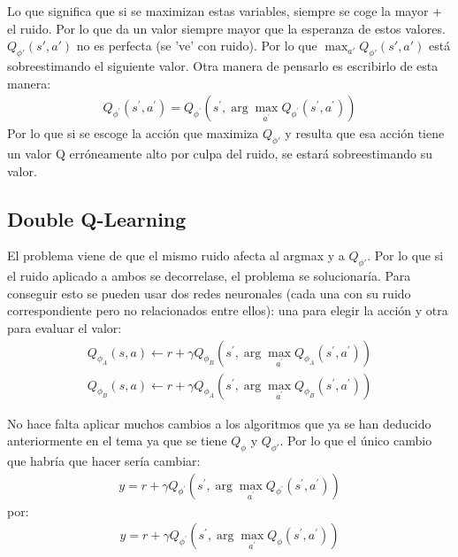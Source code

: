 Lo que significa que si se maximizan estas variables, siempre se coge la mayor + el ruido.
Por lo que da un valor siempre mayor que la esperanza de estos valores. $Q_{ \phi' }(s',a')$ no
es perfecta (se 've' con ruido). Por lo que  $\max_{a'}Q_{\phi'}(s',a')$ está sobreestimando
el siguiente valor. Otra manera de pensarlo es escribirlo de esta manera:
\begin{align}
    \label{eq:argmax}
Q _ { \phi ^ { \prime } } ( s ^ { \prime } , a ^ { \prime } ) = Q _ { \phi ^ { \prime } } ( s ^ { \prime } , \operatorname { arg } \operatorname { max } _ { a ^ { \prime } } Q _ { \phi ^ { \prime } } ( s ^ { \prime } , a ^ { \prime } ) )
\end{align}
Por lo que si se escoge la acción que maximiza $Q_{\phi'}$ y resulta que esa acción tiene un
valor Q erróneamente alto por culpa del ruido, se estará sobreestimando su valor.

\subsection{Double Q-Learning}%
\label{sub:double_q_learning}

El problema viene de que el mismo ruido afecta al argmax y a $Q_{\phi'}$. Por lo que si el
ruido aplicado a ambos se decorrelase, el problema se solucionaría. Para conseguir esto se
pueden usar dos redes neuronales (cada una con su ruido correspondiente pero no relacionados
entre ellos): una para elegir la acción y otra para evaluar el valor:
\begin{align}
Q _ { \phi _ { A } } ( s , a ) \leftarrow r + \gamma Q _ { \phi _ { B } } ( s ^ { \prime } ,
\operatorname { arg } \operatorname { max } _ { a ^ { \prime } } Q _ { \phi _ { A } } ( s ^ {
\prime } , a ^ { \prime } ) )\\
Q _ { \phi _ { B } } ( s , a ) \leftarrow r + \gamma Q _ { \phi _ { A } } ( s ^ { \prime } , \operatorname { arg } \operatorname { max } _ { a ^ { \prime } } Q _ { \phi _ { B } } ( s ^ { \prime } , a ^ { \prime } ) )
\end{align}

No hace falta aplicar muchos cambios a los algoritmos que ya se han deducido anteriormente en el
tema ya que se tiene $Q_\phi$ y  $Q_{\phi'}$. Por lo que el único cambio que habría que hacer
sería cambiar:
\begin{align}
y = r + \gamma Q _ { \phi ^ { \prime } } ( s ^ { \prime } , \operatorname { arg } \operatorname { max } _ { a ^ { \prime } } Q _ { \phi ^ { \prime } } ( s ^ { \prime } , a ^ { \prime } ) )
\end{align}
por:
\begin{align}
y = r + \gamma Q _ { \phi ^ { \prime } } ( s ^ { \prime } , \operatorname { arg } \operatorname { max } _ { a ^ { \prime } } Q _ { \phi } ( s ^ { \prime } , a ^ { \prime } ) )
\end{align}


